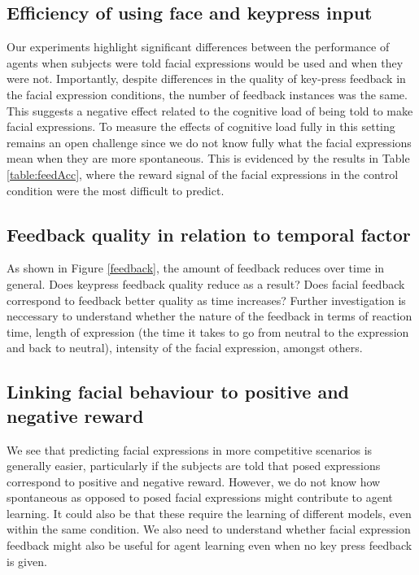 \documentclass[10pt,journal,compsoc]{IEEEtran}
\begin{document}
\subsection{Efficiency of using face and keypress input}
Our experiments highlight significant differences between the performance of agents when subjects were told facial expressions would be used and when they were not. Importantly, despite differences in the quality of key-press feedback in the facial expression conditions, the number of feedback instances was the same. This suggests a negative effect related to the cognitive load of being told to make facial expressions. To measure the effects of cognitive load fully in this setting remains an open challenge since we do not know fully what the facial expressions mean when they are more spontaneous. This is evidenced by the results in Table \ref{table:feedAcc}, where the reward signal of the facial expressions in the control condition were the most difficult to predict. 

\subsection{Feedback quality in relation to temporal factor}
As shown in Figure \ref{feedback}, the amount of feedback reduces over time in general. Does keypress feedback quality reduce as a result? Does facial feedback correspond to feedback better quality as time increases? Further investigation is neccessary to understand whether the nature of the feedback in terms of reaction time, length of expression (the time it takes to go from neutral to the expression and back to neutral), intensity of the facial expression, amongst others.


\subsection{Linking facial behaviour to positive and negative reward}
We see that predicting facial expressions in more competitive scenarios is generally easier, particularly if the subjects are told that posed expressions correspond to positive and negative reward. However, we do not know how spontaneous as opposed to posed facial expressions might contribute to agent learning. It could also be that these require the learning of different models, even within the same condition. We also need to understand whether facial expression feedback might also be useful for agent learning even when no key press feedback is given. 
\end{document}

